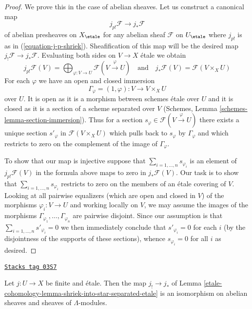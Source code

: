 \begin{proof}
We prove this in the case of abelian sheaves. Let us construct a canonical map
$$
j_{p!}\mathcal{F} \to j_*\mathcal{F}
$$
of abelian presheaves on $X_\etale$ for any abelian sheaf
$\mathcal{F}$ on $U_\etale$ where $j_{p!}$ is as in
(\ref{equation-j-p-shriek}). Sheafification of this map will
be the desired map $j_!\mathcal{F} \to j_*\mathcal{F}$.
Evaluating both sides on $V \to X$ \'etale we obtain
$$
j_{p!}\mathcal{F}(V) =
\bigoplus\nolimits_{\varphi : V \to U} \mathcal{F}(V \xrightarrow{\varphi} U)
\quad\text{and}\quad
j_*\mathcal{F}(V) = \mathcal{F}(V \times_X U)
$$
For each $\varphi$ we have an open and closed immersion
$$
\Gamma_\varphi = (1, \varphi) : V \longrightarrow V \times_X U
$$
over $U$. It is open as it is a morphism between schemes \'etale
over $U$ and it is closed as it is a section of a scheme separated
over $V$ (Schemes, Lemma \ref{schemes-lemma-section-immersion}).
Thus for a section $s_\varphi \in \mathcal{F}(V \xrightarrow{\varphi} U)$
there exists a unique section $s'_\varphi$ in $\mathcal{F}(V \times_X U)$
which pulls back to $s_\varphi$ by $\Gamma_\varphi$
and which restricts to zero on the complement of the image of $\Gamma_\varphi$.

\medskip\noindent
To show that our map is injective suppose that
$\sum_{i = 1, \ldots, n} s_{\varphi_i}$ is an element of
$j_{p!}\mathcal{F}(V)$ in the formula above maps to zero
in $j_*\mathcal{F}(V)$. Our task is to show that
$\sum_{i = 1, \ldots, n} s_{\varphi_i}$ restricts to zero
on the members of an \'etale covering of $V$.
Looking at all pairwise equalizers
(which are open and closed in $V$) of the morphisms
$\varphi_i : V \to U$ and working locally on $V$, we
may assume the images of the morphisms
$\Gamma_{\varphi_1}, \ldots, \Gamma_{\varphi_n}$
are pairwise disjoint. Since our assumption is that
$\sum_{i = 1, \ldots, n} s'_{\varphi_i} = 0$
we then immediately conclude that $s'_{\varphi_i} = 0$
for each $i$ (by the disjointness of the supports of these
sections), whence $s_{\varphi_i} = 0$ for all $i$ as desired.
\end{proof}

\begin{lemma}
\label{etale-cohomology-lemma-shriek-equals-star-finite-etale}
\href{https://stacks.math.columbia.edu/tag/03S7}{\texttt{Stacks tag 03S7}}

Let $j : U \to X$ be finite and \'etale. Then the map
$j_! \to j_*$ of Lemma \ref{etale-cohomology-lemma-shriek-into-star-separated-etale}
is an isomorphism
on abelian sheaves and sheaves of $\Lambda$-modules.
\end{lemma}

